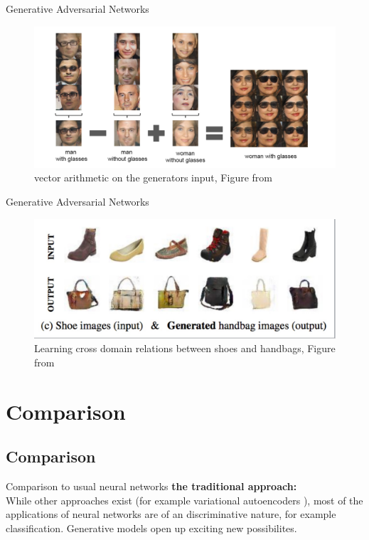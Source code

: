 \documentclass[18pt]{beamer}
\begin{document}
\begin{frame}{Generative Adversarial Networks}
    \begin{figure}[h]
    \centering
    \includegraphics[width=1\textwidth]{vector_arithmetic}
    \caption{vector arithmetic on the generators input, Figure from \cite{Radford15}}
    \end{figure}
\end{frame}

\begin{frame}{Generative Adversarial Networks}
    \begin{figure}[h]
    \centering
    \includegraphics[width=1\textwidth]{shoe2handbag}
    \caption{Learning cross domain relations between shoes and handbags, Figure from \cite{Kim17}}
    \end{figure}
\end{frame}

\section{Comparison}
\subsection{Comparison}
\begin{frame}{Comparison to usual neural networks}
    \textbf{the traditional approach:}\\
    While other approaches exist (for example variational autoencoders \cite{KingmaW13}), 
    most of the applications of neural networks are of an discriminative nature, for example classification.
    Generative models open up exciting new possibilites.
\end{frame}
\end{document}
